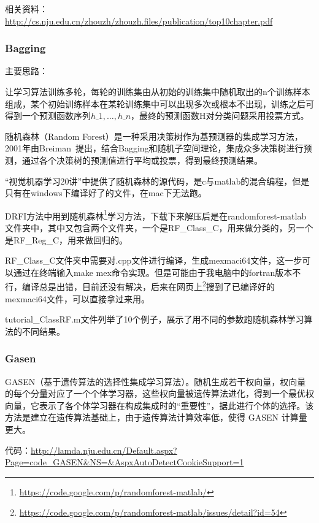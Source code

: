 \documentclass[12pt]{article}
\begin{document}
相关资料：\url{http://cs.nju.edu.cn/zhouzh/zhouzh.files/publication/top10chapter.pdf}

\subsubsection{Bagging}

{\color{blue}主要思路}：

让学习算法训练多轮，每轮的训练集由从初始的训练集中随机取出的n个训练样本组成，某个初始训练样本在某轮训练集中可以出现多次或根本不出现，训练之后可得到一个预测函数序列$h\_1,\dots,h\_n$，最终的预测函数H对分类问题采用投票方式。

随机森林（Random Forest）是一种采用决策树作为基预测器的集成学习方法，2001年由Breiman~\cite{Random Forests}提出，结合Bagging和随机子空间理论，集成众多决策树进行预测，通过各个决策树的预测值进行平均或投票，得到最终预测结果。

“视觉机器学习20讲”中提供了随机森林的源代码，是c与matlab的混合编程，但是只有在windows下编译好了的文件，在mac下无法跑。

DRFI方法中用到随机森林\footnote{\url{https://code.google.com/p/randomforest-matlab/}}学习方法，下载下来解压后是在randomforest-matlab文件夹中，其中又包含两个文件夹，一个是RF\_Class\_C，用来做分类的，另一个是RF\_Reg\_C，用来做回归的。

RF\_Class\_C文件夹中需要对.cpp文件进行编译，生成mexmaci64文件，这一步可以通过在终端输入make mex命令实现。但是可能由于我电脑中的fortran版本不行，编译总是出错，目前还没有解决，后来在网页上\footnote{\url{https://code.google.com/p/randomforest-matlab/issues/detail?id=54}}搜到了已编译好的mexmaci64文件，可以直接拿过来用。

tutorial\_ClassRF.m文件列举了10个例子，展示了用不同的参数跑随机森林学习算法的不同结果。

\subsubsection{Gasen}

GASEN\cite{zhou2002ensembling}（基于遗传算法的选择性集成学习算法）。随机生成若干权向量，权向量的每个分量对应了一个个体学习器，这些权向量被遗传算法进化，得到一个最优权向量，它表示了各个体学习器在构成集成时的“重要性”，据此进行个体的选择。该方法是建立在遗传算法基础上，由于遗传算法计算效率低，使得 GASEN 计算量更大。

代码：\url{http://lamda.nju.edu.cn/Default.aspx?Page=code_GASEN&NS=&AspxAutoDetectCookieSupport=1}





%


\end{document}
